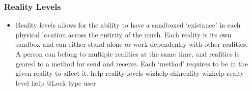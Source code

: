 \documentclass[letterpaper,10pt,english]{sphinxmanual}
\begin{document}
\subsubsection{Reality Levels}
\label{\detokenize{features:reality-levels}}\begin{itemize}
\item {} 
\sphinxAtStartPar
Reality levels allows for the ability to have a sandboxed ‘existance’
in each physical location across the entirity of the mush.  Each
reality is its own sandbox and can either stand alone or work
dependently with other realities.  A person can belong to multiple
realities at the same time, and realities is geared to a method for
send and receive.  Each ‘method’ requires to be in the given reality
to affect it.
\sphinxhyphen{} help reality levels
\sphinxhyphen{} wizhelp chkreality
\sphinxhyphen{} wizhelp reaity level
\sphinxhyphen{} help @Lock type user

\end{itemize}
\end{document}
